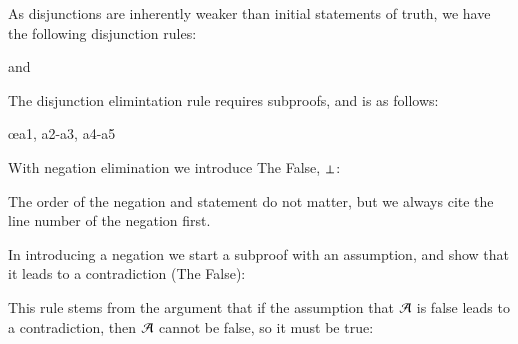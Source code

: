 \begin{definition}
    As disjunctions are inherently weaker than initial statements of truth, we have the following disjunction rules: \begin{fitchproof}
    \end{fitchproof}
    and \begin{fitchproof}
    \end{fitchproof}
\end{definition}


\begin{definition}
    The disjunction elimintation rule requires subproofs, and is as follows: \begin{fitchproof}
        \open
        \close
        \open
        \close
         \oe{a1, a2-a3, a4-a5}
    \end{fitchproof}
\end{definition}


\begin{definition}
    With negation elimination we introduce The False, $\bot$: \begin{fitchproof}
         
    \end{fitchproof}
    The order of the negation and statement do not matter, but we always cite the line number of the negation first.
\end{definition}


\begin{definition}
    In introducing a negation we start a subproof with an assumption, and show that it leads to a contradiction (The False): \begin{fitchproof}
        \open
        \close
         
    \end{fitchproof}
\end{definition}


\begin{definition}
    This rule stems from the argument that if the assumption that $\mathcal{A}$ is false leads to a contradiction, then $\mathcal{A}$ cannot be false, so it must be true: \begin{fitchproof}
        \open
        \close
         
    \end{fitchproof}
\end{definition}


